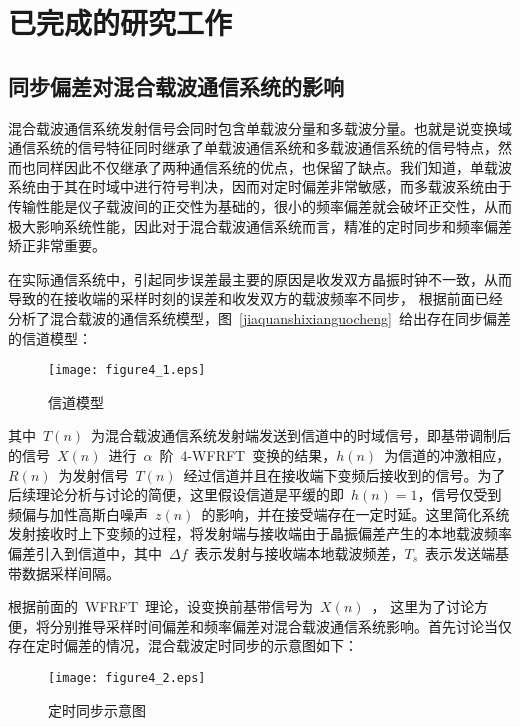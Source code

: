 
\section{已完成的研究工作}
\subsection{同步偏差对混合载波通信系统的影响}

混合载波通信系统发射信号会同时包含单载波分量和多载波分量。也就是说变换域通信系统的信号特征同时继承了单载波通信系统和多载波通信系统的信号特点，然而也同样因此不仅继承了两种通信系统的优点，也保留了缺点。我们知道，单载波系统由于其在时域中进行符号判决，因而对定时偏差非常敏感，而多载波系统由于传输性能是仪子载波间的正交性为基础的，很小的频率偏差就会破坏正交性，从而极大影响系统性能，因此对于混合载波通信系统而言，精准的定时同步和频率偏差矫正非常重要。

在实际通信系统中，引起同步误差最主要的原因是收发双方晶振时钟不一致，从而导致的在接收端的采样时刻的误差和收发双方的载波频率不同步， 根据前面已经分析了混合载波的通信系统模型，图~\ref{jiaquanshixianguocheng}~给出存在同步偏差的信道模型：
\begin{figure}[htbp]
\centering
\texttt{[image: figure4\_1.eps]}
\caption{信道模型}\vspace{-1em}\label{xindaomoxing}
\end{figure}
其中~$T(n)$~为混合载波通信系统发射端发送到信道中的时域信号，即基带调制后的信号~$X(n)$~进行~$\alpha$~阶~4-WFRFT~变换的结果，$h(n)$~为信道的冲激相应，$R(n)$~为发射信号~$T(n)$~经过信道并且在接收端下变频后接收到的信号。为了后续理论分析与讨论的简便，这里假设信道是平缓的即~$h(n)=1$，信号仅受到频偏与加性高斯白噪声~$z(n)$~的影响，并在接受端存在一定时延。这里简化系统发射接收时上下变频的过程，将发射端与接收端由于晶振偏差产生的本地载波频率偏差引入到信道中，其中~$\Delta f$~表示发射与接收端本地载波频差，$T_s$~表示发送端基带数据采样间隔。

根据前面的~WFRFT~理论，设变换前基带信号为~$X(n)$~，
这里为了讨论方便，将分别推导采样时间偏差和频率偏差对混合载波通信系统影响。首先讨论当仅存在定时偏差的情况，混合载波定时同步的示意图如下：
\begin{figure}[htbp]
\centering
\texttt{[image: figure4\_2.eps]}
\caption{定时同步示意图}\vspace{-1em}\label{dingshitongbuweizhi}
\end{figure}

